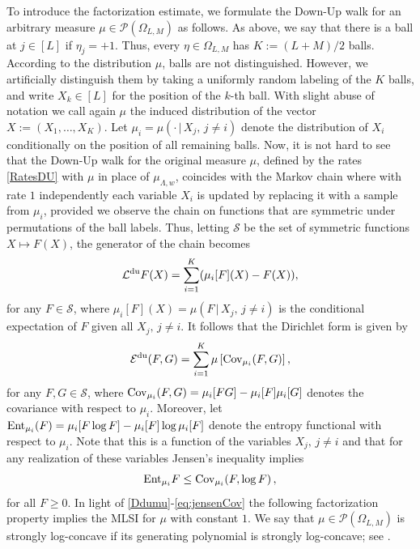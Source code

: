 \documentclass[11pt,reqno]{amsart}
\numberwithin{equation}{section}
\numberwithin{figure}{section}
\newcommand{\ent}{{\rm Ent}}
\newcommand{\cov}{{\rm Cov}}
\newcommand{\1}{\mathds{1}}
\newcommand{\tc}{\,|\,}
\let\O=\Omega
\let\L=\Lambda
\newcommand{\cE}{\ensuremath{\mathcal E}}
\newcommand{\cL}{\ensuremath{\mathcal L}}
\newcommand{\cP}{\ensuremath{\mathcal P}}
\newcommand{\cS}{\ensuremath{\mathcal S}}
\begin{document}
To introduce the factorization estimate, we formulate the Down-Up walk for an arbitrary measure $\mu\in\cP(\O_{L,M})$ as follows.
As above, we say that there is a ball at $j\in[L]$ if $\eta_j=+1$. Thus, every $\eta\in\O_{L,M}$ has $K:=(L+M)/2$ balls. According to the distribution $\mu$, balls are not distinguished. However, we artificially distinguish them by taking a uniformly random labeling of the $K$ balls, and write $X_k\in[L]$ for the position of the $k$-th ball. With slight abuse of notation we call again $\mu$ the induced distribution of the vector $X:=(X_1,\dots,X_K)$.
Let $\mu_i=\mu(\cdot\tc X_j,\,j\neq i)$ denote the distribution of $X_i$ conditionally on the position of all remaining balls. Now, it is not hard to see that the Down-Up walk for the original measure $\mu$, defined by the rates \eqref{RatesDU} with $\mu$ in place of $\mu_{\L,w}$, coincides with the Markov chain where with rate $1$ independently each variable $X_i$ is updated by replacing it with a sample from $\mu_i$, provided we observe the chain on functions that are symmetric under permutations of the ball labels. Thus, letting $\cS$ be the set of  symmetric functions $X\mapsto F(X)$, the generator of the chain becomes
 \begin{equation}\label{Ldumu}
    \cL^{\rm du} F(X) = \sum_{i=1}^K (\mu_i[F](X) - F(X)),
\end{equation}
for any $F\in\cS$, 
where $\mu_i[F](X)=\mu(F\tc X_j,\,j\neq i)$ is the conditional expectation of $F$ given all $X_j,\,j\neq i$. It follows %
that the Dirichlet form is given by 
 \begin{equation}\label{Ddumu}
    \cE^{\rm du}(F,G) = \sum_{i=1}^K \mu\left[\cov_{\mu_i}(F,G)\right],
\end{equation}
for any $F,G\in\cS$, where $\cov_{\mu_i}(F,G)=\mu_i[FG] - \mu_i[F]\mu_i[G]$ denotes the covariance with respect to $\mu_i$. 
Moreover, 
let $\ent_{\mu_i}(F)=\mu_i[F\log F]-\mu_i[F]\log\mu_i[F]$ denote the entropy functional with respect to $\mu_i$. Note that this is a function of the variables $X_j,\,j\neq i$ and that for any realization of these variables Jensen's inequality implies 
\begin{equation}\label{eq:jensenCov}
\mathrm{Ent}_{\mu_i}F\le \cov_{\mu_i}(F,\log F)\,,
\end{equation}
for all $F\ge 0$. In light of \eqref{Ddumu}-\eqref{eq:jensenCov} the following factorization property implies the MLSI for $\mu$ with constant $1$. We say that $\mu\in\cP(\O_{L,M})$ is strongly log-concave
if its generating polynomial is strongly log-concave; see \cite{CGM}. 
\end{document}

